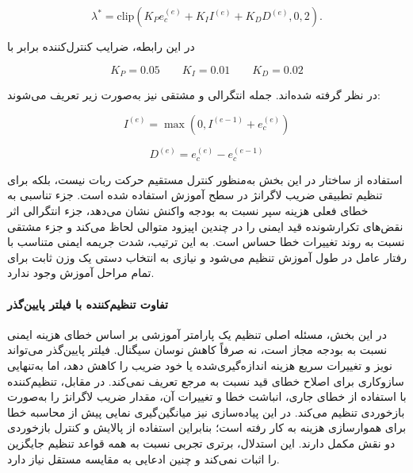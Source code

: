 \begin{equation}
	\lambda^{*} =
	\mathrm{clip}
	\left(
	K_P e_c^{(e)}
	+
	K_I I^{(e)}
	+
	K_D D^{(e)},
	0,
	2
	\right).
	\label{eq:pid_lambda_raw_final}
\end{equation}

در این رابطه، ضرایب کنترل‌کننده برابر با

\begin{equation}
	K_P=0.05
	\qquad
	K_I=0.01
	\qquad
	K_D=0.02
	\label{eq:pid_gains_final}
\end{equation}

در نظر گرفته شده‌اند. جمله انتگرالی و مشتقی نیز به‌صورت زیر تعریف می‌شوند:

\begin{equation}
	I^{(e)}
	=
	\max
	\left(
	0,
	I^{(e-1)}+e_c^{(e)}
	\right)
	\label{eq:pid_integral_final}
\end{equation}

\begin{equation}
	D^{(e)}
	=
	e_c^{(e)}
	-
	e_c^{(e-1)}
	\label{eq:pid_derivative_final}
\end{equation}

استفاده از ساختار  در این بخش به‌منظور کنترل مستقیم حرکت ربات نیست، بلکه برای تنظیم تطبیقی ضریب لاگرانژ در سطح آموزش استفاده شده است. جزء تناسبی به خطای فعلی هزینه سپر نسبت به بودجه واکنش نشان می‌دهد، جزء انتگرالی اثر نقض‌های تکرارشونده قید ایمنی را در چندین اپیزود متوالی لحاظ می‌کند و جزء مشتقی نسبت به روند تغییرات خطا حساس است. به این ترتیب، شدت جریمه ایمنی متناسب با رفتار عامل در طول آموزش تنظیم می‌شود و نیازی به انتخاب دستی یک وزن ثابت برای تمام مراحل آموزش وجود ندارد.

\paragraph{تفاوت تنظیم‌کننده  با فیلتر پایین‌گذر}
در این بخش، مسئله اصلی تنظیم یک پارامتر آموزشی بر اساس خطای هزینه ایمنی نسبت به بودجه مجاز است، نه صرفاً کاهش نوسان سیگنال. فیلتر پایین‌گذر می‌تواند نویز و تغییرات سریع هزینه اندازه‌گیری‌شده یا خود ضریب را کاهش دهد، اما به‌تنهایی سازوکاری برای اصلاح خطای قید نسبت به مرجع تعریف نمی‌کند. در مقابل، تنظیم‌کننده  با استفاده از خطای جاری، انباشت خطا و تغییرات آن، مقدار ضریب لاگرانژ را به‌صورت بازخوردی تنظیم می‌کند. در این پیاده‌سازی نیز میانگین‌گیری نمایی پیش از محاسبه خطا برای هموارسازی هزینه به کار رفته است؛ بنابراین استفاده از پالایش و کنترل بازخوردی دو نقش مکمل دارند. این استدلال، برتری تجربی  نسبت به همه قواعد تنظیم جایگزین را اثبات نمی‌کند و چنین ادعایی به مقایسه مستقل نیاز دارد.


